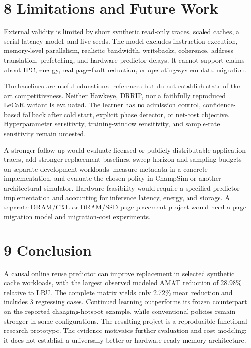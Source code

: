 \documentclass[10pt,a4paper]{article}
\begin{document}
\section*{8 Limitations and Future Work}
External validity is limited by short synthetic read-only traces, scaled caches, a serial latency model, and five seeds. The model excludes instruction execution, memory-level parallelism, realistic bandwidth, writebacks, coherence, address translation, prefetching, and hardware predictor delays. It cannot support claims about IPC, energy, real page-fault reduction, or operating-system data migration.

The baselines are useful educational references but do not establish state-of-the-art competitiveness. Neither Hawkeye, DRRIP, nor a faithfully reproduced LeCaR variant is evaluated. The learner has no admission control, confidence-based fallback after cold start, explicit phase detector, or net-cost objective. Hyperparameter sensitivity, training-window sensitivity, and sample-rate sensitivity remain untested.

A stronger follow-up would evaluate licensed or publicly distributable application traces, add stronger replacement baselines, sweep horizon and sampling budgets on separate development workloads, measure metadata in a concrete implementation, and evaluate the chosen policy in ChampSim or another architectural simulator. Hardware feasibility would require a specified predictor implementation and accounting for inference latency, energy, and storage. A separate DRAM/CXL or DRAM/SSD page-placement project would need a page migration model and migration-cost experiments.

\section*{9 Conclusion}
A causal online reuse predictor can improve replacement in selected synthetic cache workloads, with the largest observed modeled AMAT reduction of 28.98\% relative to LRU. The complete matrix yields only 2.72\% mean reduction and includes 3 regressing cases. Continued learning outperforms its frozen counterpart on the reported changing-hotspot example, while conventional policies remain stronger in some configurations. The resulting project is a reproducible functional research prototype. The evidence motivates further evaluation and cost modeling; it does not establish a universally better or hardware-ready memory architecture.
\end{document}
